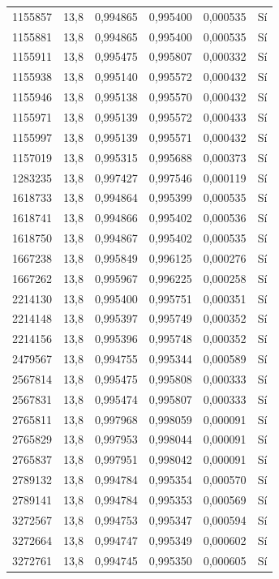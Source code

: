 \begin{longtable}{lccccc}
1155857 & 13,8 & 0,994865 & 0,995400 & 0,000535 & Sí \\
1155881 & 13,8 & 0,994865 & 0,995400 & 0,000535 & Sí \\
1155911 & 13,8 & 0,995475 & 0,995807 & 0,000332 & Sí \\
1155938 & 13,8 & 0,995140 & 0,995572 & 0,000432 & Sí \\
1155946 & 13,8 & 0,995138 & 0,995570 & 0,000432 & Sí \\
1155971 & 13,8 & 0,995139 & 0,995572 & 0,000433 & Sí \\
1155997 & 13,8 & 0,995139 & 0,995571 & 0,000432 & Sí \\
1157019 & 13,8 & 0,995315 & 0,995688 & 0,000373 & Sí \\
1283235 & 13,8 & 0,997427 & 0,997546 & 0,000119 & Sí \\
1618733 & 13,8 & 0,994864 & 0,995399 & 0,000535 & Sí \\
1618741 & 13,8 & 0,994866 & 0,995402 & 0,000536 & Sí \\
1618750 & 13,8 & 0,994867 & 0,995402 & 0,000535 & Sí \\
1667238 & 13,8 & 0,995849 & 0,996125 & 0,000276 & Sí \\
1667262 & 13,8 & 0,995967 & 0,996225 & 0,000258 & Sí \\
2214130 & 13,8 & 0,995400 & 0,995751 & 0,000351 & Sí \\
2214148 & 13,8 & 0,995397 & 0,995749 & 0,000352 & Sí \\
2214156 & 13,8 & 0,995396 & 0,995748 & 0,000352 & Sí \\
2479567 & 13,8 & 0,994755 & 0,995344 & 0,000589 & Sí \\
2567814 & 13,8 & 0,995475 & 0,995808 & 0,000333 & Sí \\
2567831 & 13,8 & 0,995474 & 0,995807 & 0,000333 & Sí \\
2765811 & 13,8 & 0,997968 & 0,998059 & 0,000091 & Sí \\
2765829 & 13,8 & 0,997953 & 0,998044 & 0,000091 & Sí \\
2765837 & 13,8 & 0,997951 & 0,998042 & 0,000091 & Sí \\
2789132 & 13,8 & 0,994784 & 0,995354 & 0,000570 & Sí \\
2789141 & 13,8 & 0,994784 & 0,995353 & 0,000569 & Sí \\
3272567 & 13,8 & 0,994753 & 0,995347 & 0,000594 & Sí \\
3272664 & 13,8 & 0,994747 & 0,995349 & 0,000602 & Sí \\
3272761 & 13,8 & 0,994745 & 0,995350 & 0,000605 & Sí \\

\end{longtable}
